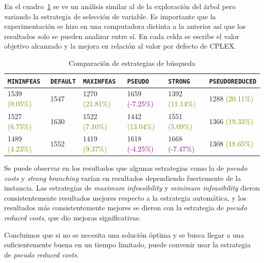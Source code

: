 \documentclass[10pt]{article}
\begin{document}
En el cuadro~\ref{tab:comparacion_varsel} se ve un análisis similar al de la exploración del árbol pero variando la estrategia de selección de variable. Es importante que la experimentación se hizo en una computadora distinta a la anterior así que los resultados solo se pueden analizar entre sí. En cada celda se escribe el valor objetivo alcanzado y la mejora en relación al valor por defecto de CPLEX.

\begin{table}[htbp]
	\centering
	\begin{tabular}{llllll}
		\hline
		\texttt{MININFEAS} & \texttt{DEFAULT} & \texttt{MAXINFEAS} & \texttt{PSEUDO} & \texttt{STRONG} & \texttt{PSEUDOREDUCED} \\
		\hline
		1539 \textcolor{olive}{(0.05\%)} & 1547 & 1270 \textcolor{olive}{(21.81\%)} & 1659 \textcolor{purple}{(-7.25\%)} & 1392 \textcolor{olive}{(11.14\%)}  & 1288 \textcolor{olive}{(20.11\%)} \\
		1527 \textcolor{olive}{(6.75\%)} & 1630 & 1522 \textcolor{olive}{(7.10\%)}  & 1442 \textcolor{olive}{(13.04\%)} & 1551 \textcolor{olive}{(5.09\%) }  & 1366 \textcolor{olive}{(19.33\%)} \\
		1489 \textcolor{olive}{(4.23\%)} & 1552 & 1419 \textcolor{olive}{(9.37\%)}  & 1618 \textcolor{purple}{(-4.25\%)} & 1668 \textcolor{purple}{(-7.47\%)}  & 1308 \textcolor{olive}{(18.65\%)} \\
		\hline
	\end{tabular}
	\caption{Comparación de estrategias de búsqueda}
	\label{tab:comparacion_varsel}
\end{table}

Se puede observar en los resultados que algunas estrategias como la de \textit{pseudo costs} y \textit{strong branching} varían en resultados dependiendo fuertemente de la instancia. Las estrategias de \textit{maximum infeasibility} y \textit{minimum infeasibility} dieron consistentemente resultados mejores respecto a la estrategia automática, y los resultados más consistentemente mejores se dieron con la estrategia de \textit{pseudo reduced costs}, que dio mejoras significativas.

Concluimos que si no se necesita una solución óptima y se busca llegar a una suficientemente buena en un tiempo limitado, puede convenir usar la estrategia de \textit{pseudo reduced costs}.
\end{document}

